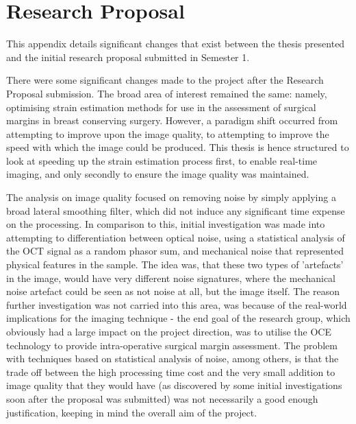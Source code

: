 \chapter{Research Proposal}

This appendix details significant changes that exist between the thesis presented and the initial research proposal submitted in Semester 1.

There were some significant changes made to the project after the Research Proposal submission. The broad area of interest remained the same: namely, optimising strain estimation methods for use in the assessment of surgical margins in breast conserving surgery. However, a paradigm shift occurred from attempting to improve upon the image quality, to attempting to improve the speed with which the image could be produced. This thesis is hence structured to look at speeding up the strain estimation process first, to enable real-time imaging, and only secondly to ensure the image quality was maintained.
 
The analysis on image quality focused on removing noise by simply applying a broad lateral smoothing filter, which did not induce any significant time expense on the processing. In comparison to this, initial investigation was made into attempting to differentiation between optical noise, using a statistical analysis of the OCT signal as a random phasor sum, and mechanical noise that represented physical features in the sample. The idea was, that these two types of 'artefacts' in the image, would have very different noise signatures, where the mechanical noise artefact could be seen as not noise at all, but the image itself. 
The reason further investigation was not carried into this area, was because of the real-world implications for the imaging technique - the end goal of the research group, which obviously had a large impact on the project direction, was to utilise the OCE technology to provide intra-operative surgical margin assessment. The problem with techniques based on statistical analysis of noise, among others, is that the trade off between the high processing time cost and the very small addition to image quality that they would have (as discovered by some initial investigations soon after the proposal was submitted) was not necessarily a good enough justification, keeping in mind the overall aim of the project. 


